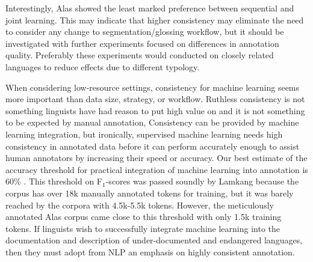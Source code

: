 Interestingly, Alas showed the least marked preference between sequential and joint learning. This may indicate that higher consistency may eliminate the need to consider any change to segmentation/glossing workflow, but it should be investigated with further experiments focused on differences in annotation quality. Preferably these experiments would conducted on closely related languages to reduce effects due to different typology. 



When considering low-resource settings, consistency for machine learning seems more important than data size, strategy, or workflow. Ruthless consistency is not something linguists have had reason to put high value on and it is not something to be expected by manual annotation, %
Consistency can be provided by machine learning integration, but ironically, supervised machine learning needs high consistency in annotated data before it can perform accurately enough to assist human annotators by increasing their speed or accuracy. Our best estimate of the accuracy threshold for practical integration of machine learning into annotation is 60\% \citep{felt_improving_2012}. This threshold on F$_1$-scores was passed soundly by Lamkang because the corpus has over 18k manually annotated tokens for training, but it was barely reached by the corpora with 4.5k-5.5k tokens. However, the meticulously annotated Alas corpus came close to this threshold with only 1.5k training tokens. If linguists wish to successfully integrate machine learning into the documentation and description of under-documented and endangered languages, then they must adopt from NLP an emphasis on highly consistent annotation.


